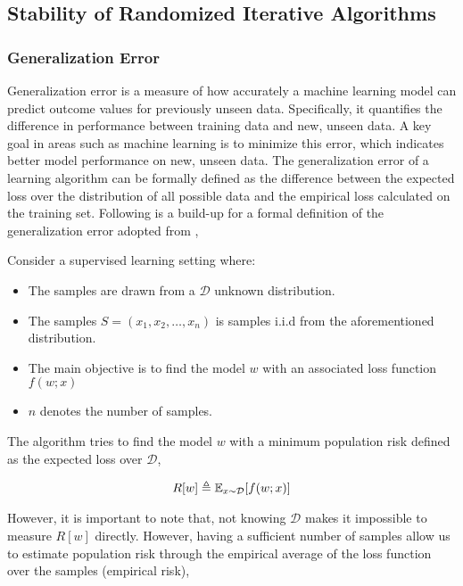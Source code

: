 

\subsection{Stability of Randomized Iterative Algorithms}

\subsubsection{Generalization Error}

Generalization error is a measure of how accurately a machine learning model can predict outcome values for previously unseen data. Specifically, it quantifies the difference in performance between training data and new, unseen data. A key goal in areas such as machine learning is to minimize this error, which indicates better model performance on new, unseen data. The generalization error of a learning algorithm can be formally defined as the difference between the expected loss over the distribution of all possible data and the empirical loss calculated on the training set. Following is a build-up for a formal definition of the generalization error adopted from \cite{Stability},  

\noindent Consider a supervised learning setting where:

\begin{itemize}
    \item The samples are drawn from a $\mathcal{D}$ unknown distribution.
    \item The samples $S = (x_1,x_2,\hdots,x_n)$ is samples i.i.d from the aforementioned distribution.
    \item The main objective is to find the model $w$ with an associated loss function $f(w;x)$
    \item $n$ denotes the number of samples.
\end{itemize}

The algorithm tries to find the model $w$ with a minimum population risk defined as the expected loss over $\mathcal{D}$,

\begin{align}
    \label{eq: population risk}
    R[w] \triangleq \mathbb{E}_{x\sim\mathcal{D}} [f(w;x)]
\end{align}

However, it is important to note that, not knowing $\mathcal{D}$ makes it impossible to measure $R[w]$ directly. However, having a sufficient number of samples allow us to estimate population risk through the empirical average of the loss function over the samples (empirical risk),

